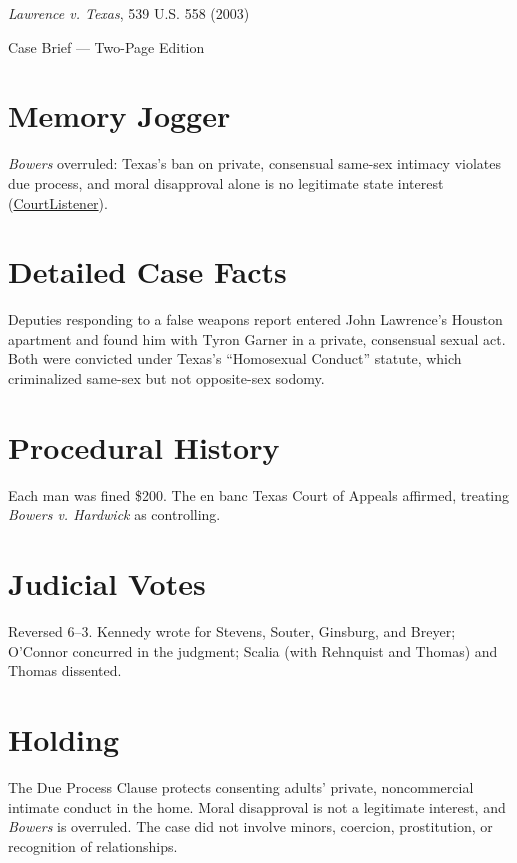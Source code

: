 \documentclass[12pt]{article}
\begin{document}
\begin{center}
{\LARGE \textit{Lawrence v. Texas}, 539 U.S. 558 (2003)\par}
\vspace{0.5em}
{\large Case Brief --- Two-Page Edition\par}
\end{center}

\section{Memory Jogger}
\textit{Bowers} overruled: Texas's ban on private, consensual same-sex intimacy violates due process, and moral disapproval alone is no legitimate state interest (\href{https://www.courtlistener.com/opinion/130160/lawrence-v-texas/}{CourtListener}).

\section{Detailed Case Facts}
Deputies responding to a false weapons report entered John Lawrence's Houston apartment and found him with Tyron Garner in a private, consensual sexual act. Both were convicted under Texas's ``Homosexual Conduct'' statute, which criminalized same-sex but not opposite-sex sodomy.

\section{Procedural History}
Each man was fined \$200. The en banc Texas Court of Appeals affirmed, treating \textit{Bowers v. Hardwick} as controlling.

\section{Judicial Votes}
Reversed 6--3. Kennedy wrote for Stevens, Souter, Ginsburg, and Breyer; O'Connor concurred in the judgment; Scalia (with Rehnquist and Thomas) and Thomas dissented.

\section{Holding}
The Due Process Clause protects consenting adults' private, noncommercial intimate conduct in the home. Moral disapproval is not a legitimate interest, and \textit{Bowers} is overruled. The case did not involve minors, coercion, prostitution, or recognition of relationships.
\end{document}
